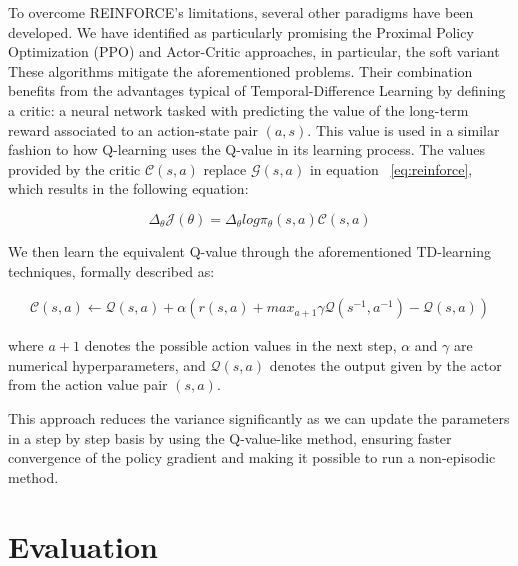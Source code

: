 To overcome REINFORCE's limitations, several other paradigms have been developed. We have identified as particularly promising the Proximal Policy Optimization (PPO)
and Actor-Critic
 approaches, in particular, the soft variant
 These algorithms mitigate the aforementioned problems.
Their combination benefits from the advantages typical of Temporal-Difference Learning
 by defining a critic: a neural network tasked with predicting the value of the long-term reward associated to an action-state pair $(a,s)$. This value is used in a similar fashion to how Q-learning
 uses the Q-value in its learning process. The values provided by the critic $\mathcal{C}(s,a)$ replace $\mathcal{G}(s,a)$ in equation
~\ref{eq:reinforce}, which results in the following equation:

\begin{equation}
\label{eq:ActorCritic}
    \Delta_{\theta}\mathcal{J}(\theta) =\Delta_{\theta}log\pi_{\theta}(s,a)\mathcal{C}(s,a) 
\end{equation}

We then learn the equivalent Q-value through the aforementioned TD-learning techniques, formally described as:

\begin{equation}
\label{eq:TemporalDifference}
\begin{split}
    \mathcal{C}(s,a) \gets \mathcal{Q}(s,a) + \alpha(r(s,a) + max_{a+1} \gamma \mathcal{Q}(s^{-1},a^{-1}) - \mathcal{Q}(s,a))
\end{split}
\end{equation}

where $a+1$ denotes the possible action values in the next step, $\alpha$ and $\gamma$ are numerical hyperparameters, and $\mathcal{Q}(s,a)$ denotes the output given by the actor from the action value pair $(s,a)$.

This approach reduces the variance significantly as we can update the parameters in a step by step basis by using the Q-value-like method, ensuring faster convergence of the policy gradient and making it possible to run a non-episodic method.


\section{Evaluation}\label{sec:spacerl-evaluation}


